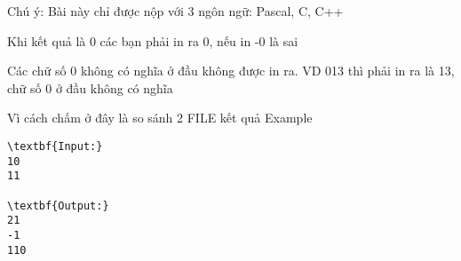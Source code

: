 Chú ý:  
Bài này chỉ được nộp với 3 ngôn ngữ: Pascal, C, C++  

   Khi kết quả là 0 các bạn phải in ra 0, nếu in -0 là sai  

   Các chữ số 0 không có nghĩa ở đầu không được in ra. VD 013 thì phải in ra là 13, chữ số 0 ở đầu không có nghĩa  

   Vì cách chấm ở đây là so sánh 2 FILE kết quả
   Example  
\begin{verbatim}
\textbf{Input:}
10
11

\textbf{Output:}
21
-1
110
\end{verbatim}